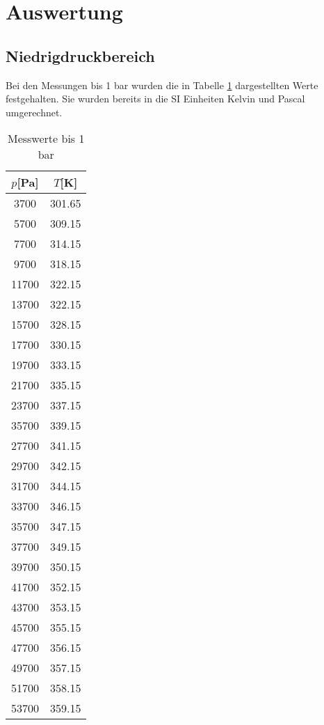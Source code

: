 \section{Auswertung}
\label{sec:Auswertung}
\subsection{Niedrigdruckbereich}

  Bei den Messungen bis 1 bar wurden die in Tabelle \ref{tab:data} dargestellten Werte festgehalten. Sie
  wurden bereits in die SI Einheiten Kelvin und Pascal umgerechnet.
  \begin{table}[H]
    \centering
   \caption{Messwerte bis 1 bar}
   \label{tab:data}
   \begin{tabular}{c c}
   \toprule
    $p$[Pa] & $T$[K] \\
    \midrule
      3700 &   301.65 \\  
      5700 &   309.15 \\  
      7700 &   314.15 \\  
      9700 &   318.15 \\ 
      11700 &   322.15 \\ 
      13700 &   322.15 \\ 
      15700 &   328.15 \\ 
      17700 &   330.15 \\ 
      19700 &   333.15 \\ 
      21700 &   335.15 \\ 
      23700 &   337.15 \\ 
      35700 &   339.15 \\ 
      27700 &   341.15 \\ 
      29700 &   342.15 \\ 
      31700 &   344.15 \\ 
      33700 &   346.15 \\ 
      35700 &   347.15 \\ 
      37700 &   349.15 \\
      39700 &   350.15 \\ 
      41700 &   352.15 \\ 
      43700 &   353.15 \\ 
      45700 &   355.15 \\ 
      47700 &   356.15 \\ 
      49700 &   357.15 \\ 
      51700 &   358.15 \\ 
      53700 &   359.15 \\ 

\end{tabular}
\end{table}
